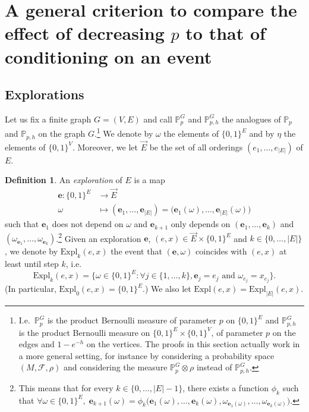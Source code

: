 \documentclass[10pt]{amsart}
\theoremstyle{definition}
\newtheorem{defi}[theo]{Definition}
\newcommand{\Pro}{\mathbb{P}}
\newcommand{\clF}{\mathcal{F}}
\newcommand{\ee}{\mathbf{e}}
\newcommand{\Expl}{\mathrm{Expl}}
\let\oldforall\forall
\renewcommand*{\forall}{\mathrel{\oldforall}}
\begin{document}
\section{A general criterion to compare the effect of decreasing \texorpdfstring{$p$}{p} to that of conditioning on an event}\label{sec:gen}

\subsection{Explorations}

Let us fix a finite graph $G=(V,E)$ and call $\Pro_p^G$ and $\Pro_{p,h}^{G}$ the analogues of $\Pro_p$ and $\Pro_{p,h}$ on the graph $G$.\footnote{I.e.\ $\Pro_p^G$ is the product Bernoulli measure of parameter $p$ on $\{0,1\}^E$ and $\Pro_{p,h}^G$ is the product Bernoulli measure on $\{0,1\}^E\times\{0,1\}^V$, of parameter $p$ on the edges and $1-e^{-h}$ on the vertices. The proofs in this section actually work in a more general setting, for instance by considering a probability space $(M,\clF,\rho)$ and considering the measure $\Pro_p^G\otimes\rho$ instead of $\Pro_{p,h}^G$.} We denote by $\omega$ the elements of $\{0,1\}^E$ and by $\eta$ the elements of $\{0,1\}^V$. Moreover, we let $\vec{E}$ be the set of all orderings $(e_1,\dots,e_{|E|})$ of $E$.

\begin{defi}\label{defi:expl}
An \emph{exploration} of $E$ is a map
\begin{align*}
\ee : \{0,1\}^E & \longrightarrow \vec{E}\\
\omega & \longmapsto (\ee_1,\dots,\ee_{|E|})=\big(\ee_1(\omega),\dots,\ee_{|E|}(\omega)\big)
\end{align*}
such that $\ee_1$ does not depend on $\omega$ and $\ee_{k+1}$ only depends on $(\ee_1,\dots,\ee_k)$ and $(\omega_{\ee_1},\dots,\omega_{\ee_k})$.\footnote{This means that for every $k \in \{0,\dots,|E|-1\}$, there exists a function $\phi_k$ such that $\forall \omega \in \{0,1\}^E, \; \ee_{k+1}(\omega)=\phi_k\big(\ee_1(\omega),\dots,\ee_k(\omega),\omega_{\ee_1(\omega)},\dots,\omega_{\ee_k(\omega)})$.}
Given an exploration $\ee$, $(e,x) \in \vec{E}\times\{0,1\}^E$ and $k \in \{0,\dots,|E|\}$, we denote by $\Expl_k(e,x)$ the event that $(\ee,\omega)$ coincides with $(e,x)$ at least until step $k$, i.e.
\[
\Expl_k(e,x)=\big\{\omega \in \{0,1\}^E : \forall j \in \{1,\dots,k\}, \ee_j=e_j\text{ and }\omega_{e_j}=x_{e_j}\big\}.
\]
(In particular, $\Expl_0(e,x)=\{0,1\}^E$.) We also let $\Expl(e,x)=\Expl_{|E|}(e,x)$.
\end{defi}
\end{document}
